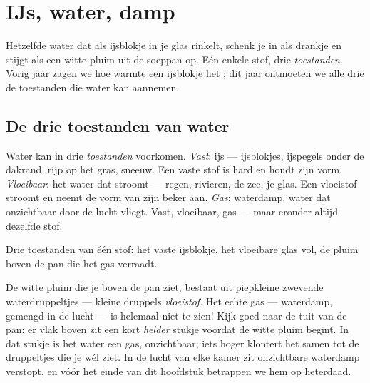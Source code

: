 \chapter{IJs, water, damp}\label{ch:g2:ice-water-steam}

Hetzelfde water dat als ijsblokje in je glas rinkelt, schenk je in als
drankje en stijgt als een witte pluim uit de soeppan op. Eén enkele
stof, drie \emph{toestanden}. Vorig jaar zagen we hoe warmte een
ijsblokje liet ; dit jaar ontmoeten we alle drie de toestanden
die water kan aannemen.

\section{De drie toestanden van water}

\begin{example}\label{ex:g2:ice-water-steam:where}
Water kan in drie \emph{toestanden} voorkomen. \emph{Vast}: ijs ---
ijsblokjes, ijspegels onder de dakrand, rijp op het gras, sneeuw. Een
vaste stof is hard en houdt zijn vorm. \emph{Vloeibaar}: het water dat
stroomt --- regen, rivieren, de zee, je glas. Een vloeistof stroomt en
neemt de vorm van zijn beker aan. \emph{Gas}: waterdamp, water dat
onzichtbaar door de lucht vliegt. Vast, vloeibaar, gas --- maar
eronder altijd dezelfde stof.
\end{example}

\begin{omfigure}

{\small Drie toestanden van één stof: het vaste ijsblokje, het
vloeibare glas vol, de pluim boven de pan die het gas verraadt.}
\end{omfigure}

\begin{remark}\label{rem:g2:ice-water-steam:invisible}
De witte pluim die je boven de pan ziet, bestaat uit piepkleine
zwevende waterdruppeltjes --- kleine druppels \emph{vloeistof}. Het
echte gas --- waterdamp, gemengd in de lucht --- is helemaal niet te
zien! Kijk goed naar de tuit van de pan: er vlak boven zit een kort
\emph{helder} stukje voordat de witte pluim begint. In dat stukje is
het water een gas, onzichtbaar; iets hoger klontert het samen tot de
druppeltjes die je wél ziet. In de lucht van elke kamer zit
onzichtbare waterdamp verstopt, en vóór het einde van dit hoofdstuk
betrappen we hem op heterdaad.
\end{remark}

